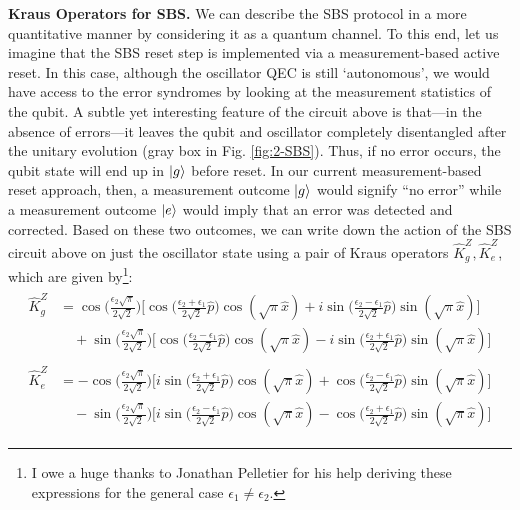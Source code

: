\noindent \textbf{Kraus Operators for SBS.} We can describe the SBS protocol in a more quantitative manner by considering it as a quantum channel. To this end, let us imagine that the SBS reset step is implemented via a measurement-based active reset. In this case, although the oscillator QEC is still `autonomous', we would have access to the error syndromes by looking at the measurement statistics of the qubit. A subtle yet interesting feature of the circuit above is that---in the absence of errors---it leaves the qubit and oscillator completely disentangled after the unitary evolution (gray box in Fig. \ref{fig:2-SBS}). Thus, if no error occurs, the qubit state will end up in $\lvert g\rangle$ before reset. In our current measurement-based reset approach, then, a measurement outcome $\lvert g\rangle$ would signify ``no error'' while a measurement outcome $\lvert e\rangle$ would imply that an error was detected and corrected. Based on these two outcomes, we can write down the action of the SBS circuit above on just the oscillator state using a pair of Kraus operators $\hat{K}_g^Z, \hat{K}_e^Z$, which are given by\footnote{I owe a huge thanks to Jonathan Pelletier for his help deriving these expressions for the general case $\epsilon_1 \neq \epsilon_2$.}:     
\begin{align}
    \begin{split}
        \hat{K}_g^Z &= \cos\bigg(\frac{\epsilon_2 \sqrt{\pi}}{2\sqrt{2}}\bigg)\Bigg[\cos\bigg(\frac{\epsilon_2 + \epsilon_1}{2\sqrt{2}} \hat{p}\bigg)\cos(\sqrt{\pi} \hat{x}) + i\sin\bigg(\frac{\epsilon_2 - \epsilon_1}{2\sqrt{2}} \hat{p}\bigg)\sin(\sqrt{\pi} \hat{x})\Bigg] \\
        &\quad + \sin\bigg(\frac{\epsilon_2 \sqrt{\pi}}{2\sqrt{2}}\bigg)\Bigg[\cos\bigg(\frac{\epsilon_2 - \epsilon_1}{2\sqrt{2}} \hat{p}\bigg)\cos(\sqrt{\pi} \hat{x}) - i\sin\bigg(\frac{\epsilon_2 + \epsilon_1}{2\sqrt{2}} \hat{p}\bigg)\sin(\sqrt{\pi} \hat{x})\Bigg]
    \end{split} \\
    \begin{split}
        \hat{K}_e^Z &= -\cos\bigg(\frac{\epsilon_2 \sqrt{\pi}}{2\sqrt{2}}\bigg)\Bigg[i\sin\bigg(\frac{\epsilon_2 + \epsilon_1}{2\sqrt{2}} \hat{p}\bigg)\cos(\sqrt{\pi} \hat{x}) + \cos\bigg(\frac{\epsilon_2 - \epsilon_1}{2\sqrt{2}} \hat{p}\bigg)\sin(\sqrt{\pi} \hat{x})\Bigg] \\
        &\quad -\sin\bigg(\frac{\epsilon_2 \sqrt{\pi}}{2\sqrt{2}}\bigg)\Bigg[i\sin\bigg(\frac{\epsilon_2 - \epsilon_1}{2\sqrt{2}} \hat{p}\bigg)\cos(\sqrt{\pi} \hat{x}) - \cos\bigg(\frac{\epsilon_2 + \epsilon_1}{2\sqrt{2}} \hat{p}\bigg)\sin(\sqrt{\pi} \hat{x})\Bigg]
    \end{split}
\end{align}
